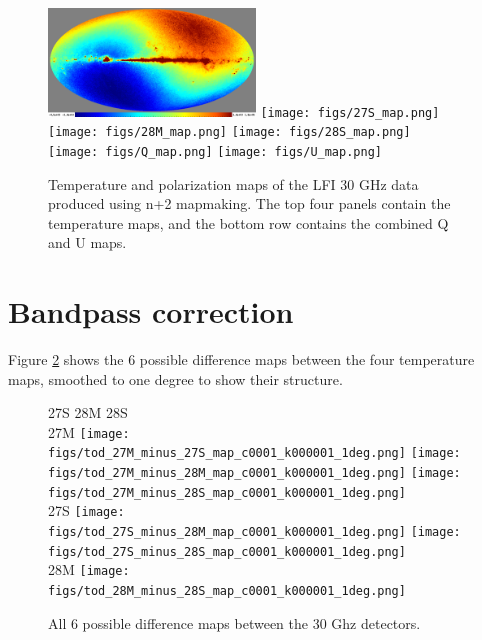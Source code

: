 \documentclass{aa}
\begin{document}
\begin{figure}
  \centering
  \includegraphics[width=0.49\textwidth]{figs/27M_map.png}
  \texttt{[image: figs/27S\_map.png]}\\
  \texttt{[image: figs/28M\_map.png]}
  \texttt{[image: figs/28S\_map.png]}\\
  \texttt{[image: figs/Q\_map.png]}
  \texttt{[image: figs/U\_map.png]}\\
  \caption{Temperature and polarization maps of the LFI 30 GHz data produced using n+2 mapmaking. The top four panels contain the temperature maps, and the bottom row contains the combined Q and U maps.}
  \label{fig:maps}
\end{figure}

\section{Bandpass correction}

Figure \ref{fig:bp_diffs} shows the 6 possible difference maps between the four temperature maps, smoothed to one degree to show their structure.

\begin{figure}
\hspace{0.8in} 27S \hspace{2in} 28M \hspace{2in} 28S\\
  \centering
  27M \texttt{[image: figs/tod\_27M\_minus\_27S\_map\_c0001\_k000001\_1deg.png]}
  \texttt{[image: figs/tod\_27M\_minus\_28M\_map\_c0001\_k000001\_1deg.png]}
  \texttt{[image: figs/tod\_27M\_minus\_28S\_map\_c0001\_k000001\_1deg.png]}\\
  \hspace{2.3in}
  27S \texttt{[image: figs/tod\_27S\_minus\_28M\_map\_c0001\_k000001\_1deg.png]}
    \texttt{[image: figs/tod\_27S\_minus\_28S\_map\_c0001\_k000001\_1deg.png]}\\
     \hspace{4.6in}
    28M \texttt{[image: figs/tod\_28M\_minus\_28S\_map\_c0001\_k000001\_1deg.png]} \\
  \caption{All 6 possible difference maps between the 30 Ghz detectors. }
  \label{fig:bp_diffs}
\end{figure}
\end{document}
